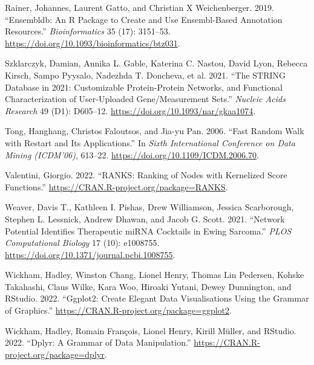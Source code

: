 \documentclass{article}
\newlength{\cslhangindent}
\newlength{\cslentryspacingunit} %
\newenvironment{CSLReferences}[2] %
 {%
  \setlength{\parindent}{0pt}
  \ifodd #1
  \let\oldpar\par
  \def\par{\hangindent=\cslhangindent\oldpar}
  \fi
  \setlength{\parskip}{#2\cslentryspacingunit}
 }%
 {}
\begin{document}
\begin{CSLReferences}{1}{0}
\leavevmode{}%
Rainer, Johannes, Laurent Gatto, and Christian X Weichenberger. 2019.
{``Ensembldb: An {R} Package to Create and Use {Ensembl}-Based
Annotation Resources.''} \emph{Bioinformatics} 35 (17): 3151--53.
\url{https://doi.org/10.1093/bioinformatics/btz031}.

\leavevmode{}%
Szklarczyk, Damian, Annika L. Gable, Katerina C. Nastou, David Lyon,
Rebecca Kirsch, Sampo Pyysalo, Nadezhda T. Doncheva, et al. 2021. {``The
{STRING} Database in 2021: Customizable Protein-Protein Networks, and
Functional Characterization of User-Uploaded Gene/Measurement Sets.''}
\emph{Nucleic Acids Research} 49 (D1): D605--12.
\url{https://doi.org/10.1093/nar/gkaa1074}.

\leavevmode{}%
Tong, Hanghang, Christos Faloutsos, and Jia-yu Pan. 2006. {``Fast
{Random} {Walk} with {Restart} and {Its} {Applications}.''} In
\emph{Sixth {International} {Conference} on {Data} {Mining}
({ICDM}'06)}, 613--22. \url{https://doi.org/10.1109/ICDM.2006.70}.

\leavevmode{}%
Valentini, Giorgio. 2022. {``{RANKS}: {Ranking} of {Nodes} with
{Kernelized} {Score} {Functions}.''}
\url{https://CRAN.R-project.org/package=RANKS}.

\leavevmode{}%
Weaver, Davis T., Kathleen I. Pishas, Drew Williamson, Jessica
Scarborough, Stephen L. Lessnick, Andrew Dhawan, and Jacob G. Scott.
2021. {``Network Potential Identifies Therapeutic {miRNA} Cocktails in
{Ewing} Sarcoma.''} \emph{PLOS Computational Biology} 17 (10): e1008755.
\url{https://doi.org/10.1371/journal.pcbi.1008755}.

\leavevmode{}%
Wickham, Hadley, Winston Chang, Lionel Henry, Thomas Lin Pedersen,
Kohske Takahashi, Claus Wilke, Kara Woo, Hiroaki Yutani, Dewey
Dunnington, and RStudio. 2022. {``Ggplot2: {Create} {Elegant} {Data}
{Visualisations} {Using} the {Grammar} of {Graphics}.''}
\url{https://CRAN.R-project.org/package=ggplot2}.

\leavevmode{}%
Wickham, Hadley, Romain François, Lionel Henry, Kirill Müller, and
RStudio. 2022. {``Dplyr: {A} {Grammar} of {Data} {Manipulation}.''}
\url{https://CRAN.R-project.org/package=dplyr}.


\end{CSLReferences}
\end{document}

